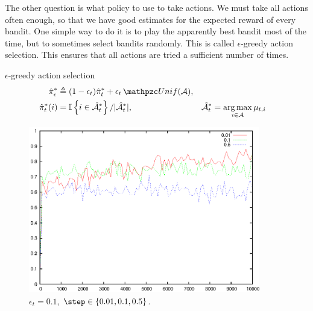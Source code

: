 \begin{frame}
{    The other question is what policy to use to take actions. We must take all actions often enough, so that we have good estimates for the expected reward of every bandit. One simple way to do it is to play the apparently best bandit most of the time, but to sometimes select bandits randomly. This is called $\epsilon$-greedy action selection. This ensures that all actions are tried a sufficient number of times.
  }
  \begin{definition}{$\epsilon$-greedy action selection}
    \begin{align}
      \hat{\pi}^*_\epsilon &\defn (1 - \epsilon_t) \hat{\pi}^*_t + \epsilon_t \Uniform(\CA),
      \\
      \hat{\pi}^*_t(i) &= \ind{i \in \hat{\CA}^*_t}/|\hat{\CA}^*_t|,
      &
      \hat{\CA}^*_t &= \argmax_{i \in \CA} \mu_{t,i}
      \label{eq:eps-greedy}
    \end{align}
  \end{definition}
\end{frame}

\begin{frame}
  \begin{figure}[H]
    \centering
    \includegraphics[width=0.9\textwidth]{figures/bandit_fixed_epsilon}
    \caption{$\epsilon_t = 0.1$, $\step \in \{0.01, 0.1, 0.5\}$.}
    \label{fig:bandit-fixed-epsilon}
  \end{figure}
\end{frame}

